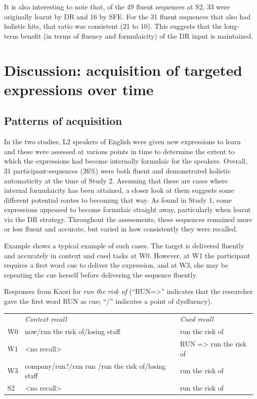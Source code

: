 \documentclass[output=paper]{langscibook}
\begin{document}
It is also interesting to note that, of the 49 fluent sequences at S2, 33 were originally learnt by DR and 16 by SFE. For the 31 fluent sequences that also had holistic hits, that ratio was consistent (21 to 10). This suggests that the long-term benefit (in terms of fluency and formulaicity) of the DR input is maintained. 

\section{Discussion: acquisition of targeted expressions over time}
\subsection{Patterns of acquisition}

In the two studies, L2 speakers of English were given new expressions to learn and these were assessed at various points in time to determine the extent to which the expressions had become internally formulaic for the speakers. Overall, 31 participant-sequences (26\%) were both fluent and demonstrated holistic automaticity at the time of Study 2. Assuming that these are cases where internal formulaicity has been attained, a closer look at them suggests some different potential routes to becoming that way. As found in Study 1, some expressions appeared to become formulaic straight away, particularly when learnt via the DR strategy. Throughout the assessments, these sequences remained more or less fluent and accurate, but varied in how consistently they were recalled. 

Example  shows a typical example of such cases. The target is delivered fluently and accurately in context and cued tasks at W0. However, at W1 the participant requires a first word cue to deliver the expression, and at W3, she may be repeating the cue herself before delivering the sequence fluently.


\ea Responses from Kaori for \textit{run the risk of} (``RUN=>'' indicates that the researcher gave the first word RUN as cue; ``/'' indicates a point of dysfluency).\smallskip\\\label{ex:cutler:2}
\begin{tabularx}{\linewidth}{@{}lQQ@{}}
& {\itshape Context recall} & {\itshape Cued recall}\\
W0 & now\slash run the risk of\slash losing staff & run the risk of\\
W1 & <no recall> & RUN => run the risk of\\
W3 & company\slash run?\slash run run /run the risk of\slash losing staff & run the risk of\\
S2 & <no recall> & run the risk of\\
\end{tabularx}
\z
\end{document}
